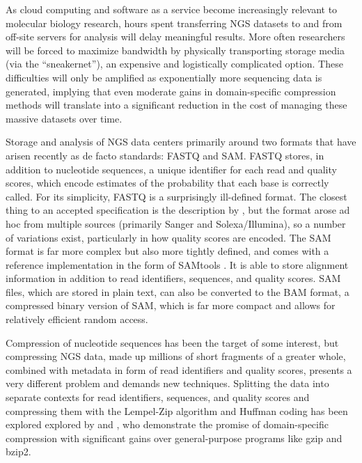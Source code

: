 \documentclass[a4,center,fleqn]{NAR}
\begin{document}
As cloud computing and software as a service become increasingly relevant to
molecular biology research, hours spent transferring NGS datasets to and from
off-site servers for analysis will delay meaningful results. More often
researchers will be forced to maximize bandwidth by physically transporting
storage media (via the ``sneakernet''), an expensive and logistically
complicated option. These difficulties will only be amplified as exponentially
more sequencing data is generated,  implying that even moderate gains in
domain-specific compression methods will translate into a significant
reduction in the cost of managing these massive datasets over time.

\enlargethispage{-65.1pt}

Storage and analysis of NGS data centers primarily around two formats that
have arisen recently as de facto standards: FASTQ and SAM. FASTQ stores, in
addition to nucleotide sequences, a unique identifier for each read and
quality scores, which encode estimates of the probability that each base is
correctly called. For its simplicity, FASTQ is a surprisingly ill-defined
format. The closest thing to an accepted specification is the description by
\citet{Cock2010}, but the format arose ad hoc from multiple sources (primarily
Sanger and Solexa/Illumina), so a number of variations exist, particularly in
how quality scores are encoded. The SAM format is far more complex but also
more tightly defined, and comes with a reference implementation in the form of
SAMtools \citep{Li2009b}. It is able to store alignment information in
addition to read identifiers, sequences, and quality scores. SAM files, which
are stored in plain text, can also be converted to the BAM format, a
compressed binary version of SAM, which is far more compact and allows for
relatively efficient random access.

Compression of nucleotide sequences has been the target of some interest, but
compressing NGS data, made up millions of short fragments of a greater whole,
combined with metadata in form of read identifiers and quality scores,
presents a very different problem and demands new techniques. Splitting the
data into separate contexts for read identifiers, sequences, and quality
scores and compressing them with the Lempel-Zip algorithm and Huffman coding
has been explored explored by \citet{Tembe2010} and \citet{Deorowicz2011}, who
demonstrate the promise of domain-specific compression with significant gains
over general-purpose programs like gzip and bzip2.
\end{document}
